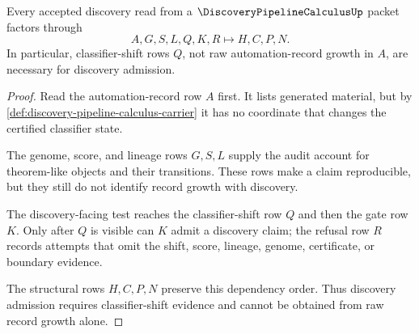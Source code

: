 \begin{theorem}
\label{thm:discovery-pipeline-calculus-classifier-shift-admission}
Every accepted discovery read from a $\DiscoveryPipelineCalculusUp$ packet factors through
$$
A,G,S,L,Q,K,R \longmapsto H,C,P,N .
$$
In particular, classifier-shift rows $Q$, not raw automation-record growth in $A$, are necessary for discovery admission.
\end{theorem}
\begin{proof}
Read the automation-record row $A$ first. It lists generated material, but by \autoref{def:discovery-pipeline-calculus-carrier} it has no coordinate that changes the certified classifier state.

The genome, score, and lineage rows $G,S,L$ supply the audit account for theorem-like objects and their transitions. These rows make a claim reproducible, but they still do not identify record growth with discovery.

The discovery-facing test reaches the classifier-shift row $Q$ and then the gate row $K$. Only after $Q$ is visible can $K$ admit a discovery claim; the refusal row $R$ records attempts that omit the shift, score, lineage, genome, certificate, or boundary evidence.

The structural rows $H,C,P,N$ preserve this dependency order. Thus discovery admission requires classifier-shift evidence and cannot be obtained from raw record growth alone.
\end{proof}

